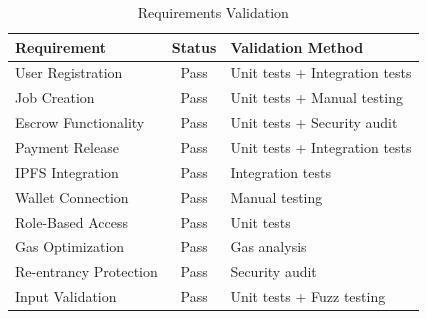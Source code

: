 \begin{table}[H]
\centering
\caption{Requirements Validation}
\begin{tabular}{|p{3cm}|c|p{8cm}|}
\hline
\textbf{Requirement} & \textbf{Status} & \textbf{Validation Method} \\
\hline
User Registration & Pass & Unit tests + Integration tests \\
\hline
Job Creation & Pass & Unit tests + Manual testing \\
\hline
Escrow Functionality & Pass & Unit tests + Security audit \\
\hline
Payment Release & Pass & Unit tests + Integration tests \\
\hline
IPFS Integration & Pass & Integration tests \\
\hline
Wallet Connection & Pass & Manual testing \\
\hline
Role-Based Access & Pass & Unit tests \\
\hline
Gas Optimization & Pass & Gas analysis \\
\hline
Re-entrancy Protection & Pass & Security audit \\
\hline
Input Validation & Pass & Unit tests + Fuzz testing \\
\hline
\end{tabular}
\end{table}